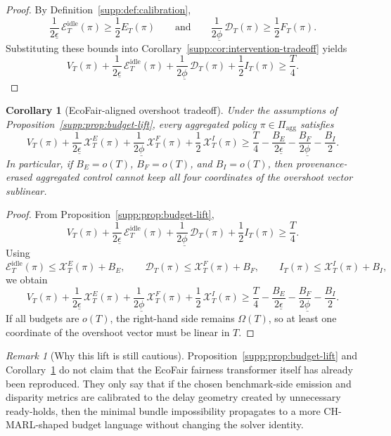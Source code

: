 \documentclass[11pt]{article}
\newcommand{\1}{\mathbf{1}}
\theoremstyle{definition}
\theoremstyle{plain}
\newtheorem{corollary}[definition]{Corollary}
\theoremstyle{remark}
\newtheorem{remark}[definition]{Remark}
\begin{document}
\begin{proof}
By Definition~\ref{supp:def:calibration},
\[
\frac{1}{2\underline\epsilon}\,\mathcal E_T^{\mathrm{idle}}(\pi)\ge \frac{1}{2}E_T(\pi)
\qquad\text{and}\qquad
\frac{1}{2\underline\phi}\,\mathcal D_T(\pi)\ge \frac{1}{2}F_T(\pi).
\]
Substituting these bounds into Corollary~\ref{supp:cor:intervention-tradeoff} yields
\[
V_T(\pi)
+ \frac{1}{2\underline\epsilon}\,\mathcal E_T^{\mathrm{idle}}(\pi)
+ \frac{1}{2\underline\phi}\,\mathcal D_T(\pi)
+ \frac{1}{2} I_T(\pi)
\ge \frac{T}{4}.
\]
\end{proof}

\begin{corollary}[EcoFair-aligned overshoot tradeoff]
\label{supp:cor:budget-overshoot}
Under the assumptions of Proposition~\ref{supp:prop:budget-lift}, every aggregated policy $\pi\in\Pi_{\mathrm{agg}}$ satisfies
\[
V_T(\pi)
+ \frac{1}{2\underline\epsilon}\,\mathcal X_T^{E}(\pi)
+ \frac{1}{2\underline\phi}\,\mathcal X_T^{F}(\pi)
+ \frac{1}{2}\,\mathcal X_T^{I}(\pi)
\ge
\frac{T}{4}
- \frac{B_E}{2\underline\epsilon}
- \frac{B_F}{2\underline\phi}
- \frac{B_I}{2}.
\]
In particular, if $B_E=o(T)$, $B_F=o(T)$, and $B_I=o(T)$, then provenance-erased aggregated control cannot keep all four coordinates of the overshoot vector sublinear.
\end{corollary}

\begin{proof}
From Proposition~\ref{supp:prop:budget-lift},
\[
V_T(\pi)
+ \frac{1}{2\underline\epsilon}\,\mathcal E_T^{\mathrm{idle}}(\pi)
+ \frac{1}{2\underline\phi}\,\mathcal D_T(\pi)
+ \frac{1}{2} I_T(\pi)
\ge \frac{T}{4}.
\]
Using
\[
\mathcal E_T^{\mathrm{idle}}(\pi)
\le \mathcal X_T^{E}(\pi)+B_E,
\qquad
\mathcal D_T(\pi)
\le \mathcal X_T^{F}(\pi)+B_F,
\qquad
I_T(\pi)
\le \mathcal X_T^{I}(\pi)+B_I,
\]
we obtain
\[
V_T(\pi)
+ \frac{1}{2\underline\epsilon}\,\mathcal X_T^{E}(\pi)
+ \frac{1}{2\underline\phi}\,\mathcal X_T^{F}(\pi)
+ \frac{1}{2}\,\mathcal X_T^{I}(\pi)
\ge
\frac{T}{4}
- \frac{B_E}{2\underline\epsilon}
- \frac{B_F}{2\underline\phi}
- \frac{B_I}{2}.
\]
If all budgets are $o(T)$, the right-hand side remains $\Omega(T)$, so at least one coordinate of the overshoot vector must be linear in $T$.
\end{proof}

\begin{remark}[Why this lift is still cautious]
\label{supp:rem:budget-lift-caution}
Proposition~\ref{supp:prop:budget-lift} and Corollary~\ref{supp:cor:budget-overshoot} do not claim that the EcoFair fairness transformer itself has already been reproduced. They only say that if the chosen benchmark-side emission and disparity metrics are calibrated to the delay geometry created by unnecessary ready-holds, then the minimal bundle impossibility propagates to a more CH-MARL-shaped budget language without changing the solver identity.
\end{remark}
\end{document}
